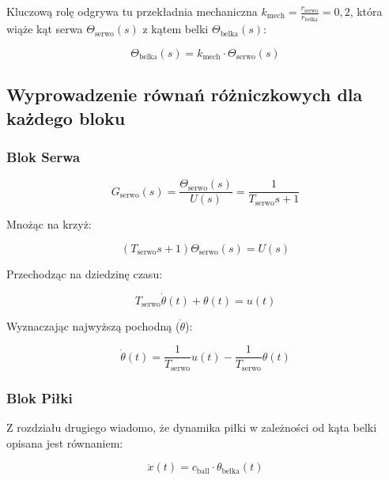 Kluczową rolę odgrywa tu przekładnia mechaniczna $k_{\mathrm{mech}} = \frac{r_{\mathrm{serwo}}}{r_{\mathrm{belka}}} = 0{,}2$, która wiąże kąt serwa $\Theta_{\mathrm{serwo}}(s)$ z kątem belki $\Theta_{\mathrm{belka}}(s)$:

\begin{equation}
\Theta_{\mathrm{belka}}(s) = k_{\mathrm{mech}} \cdot \Theta_{\mathrm{serwo}}(s)
\end{equation}

\subsection{Wyprowadzenie równań różniczkowych dla każdego bloku}

\subsubsection{Blok Serwa}

\begin{equation}
    G_{\mathrm{serwo}}(s) = \frac{\Theta_{\mathrm{serwo}}(s)}{U(s)}=\frac{1}{T_{\mathrm{serwo}} s + 1}
\end{equation}

Mnożąc na krzyż:

\begin{equation}
(T_{\mathrm{serwo}} s + 1) \Theta_{\mathrm{serwo}}(s) = U(s)
\end{equation}

Przechodząc na dziedzinę czasu:

\begin{equation}
T_{\mathrm{serwo}} \dot{\theta}(t) + \theta(t) = u(t)
\end{equation}

Wyznaczając najwyższą pochodną ($\dot{\theta}$):

\begin{equation}
\dot{\theta}(t) = \frac{1}{T_{\mathrm{serwo}}} u(t) - \frac{1}{T_{\mathrm{serwo}}} \theta(t)
\label{eq:servo_dynamics}
\end{equation}

\subsubsection{Blok Piłki}

Z rozdziału drugiego wiadomo, że dynamika piłki w zależności od kąta belki opisana jest równaniem:

\begin{equation}
\ddot{x}(t) = c_{\mathrm{ball}} \cdot \theta_{\mathrm{belka}}(t)
\label{eq:ball_dynamics}
\end{equation}

